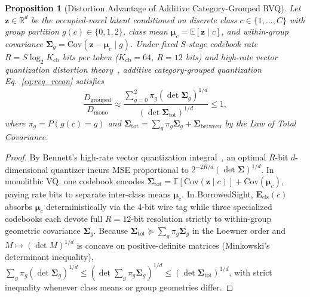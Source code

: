 \documentclass[journal]{IEEEtran}
\newtheorem{proposition}{Proposition}
\begin{document}
\begin{proposition}[Distortion Advantage of Additive Category-Grouped RVQ]
Let $\mathbf{z} \in \mathbb{R}^d$ be the occupied-voxel latent conditioned on discrete class $c \in \{1,\dots,C\}$ with group partition $g(c) \in \{0,1,2\}$, class mean $\boldsymbol{\mu}_c = \mathbb{E}[\mathbf{z}\mid c]$, and within-group covariance $\boldsymbol{\Sigma}_g = \mathrm{Cov}(\mathbf{z} - \boldsymbol{\mu}_c \mid g)$. Under fixed $S$-stage codebook rate $R = S \log_2 K_{\mathrm{cb}}$ bits per token ($K_{\mathrm{cb}} = 64$, $R = 12$ bits) and high-rate vector quantization distortion theory~\cite{gray1998quantization}, additive category-grouped quantization Eq.~\eqref{eq:rvq_recon} satisfies
\begin{equation}
\frac{D_{\mathrm{grouped}}}{D_{\mathrm{mono}}} \approx \frac{\sum_{g=0}^{2} \pi_g \left(\det \boldsymbol{\Sigma}_g\right)^{1/d}}{\left(\det \boldsymbol{\Sigma}_{\mathrm{tot}}\right)^{1/d}} \le 1,
\label{eq:rd_ratio}
\end{equation}
where $\pi_g = P(g(c) = g)$ and $\boldsymbol{\Sigma}_{\mathrm{tot}} = \sum_g \pi_g \boldsymbol{\Sigma}_g + \boldsymbol{\Sigma}_{\mathrm{between}}$ by the Law of Total Covariance.
\end{proposition}
\begin{proof}
By Bennett's high-rate vector quantization integral~\cite{gray1998quantization}, an optimal $R$-bit $d$-dimensional quantizer incurs MSE proportional to $2^{-2R/d} (\det \boldsymbol{\Sigma})^{1/d}$. In monolithic VQ, one codebook encodes $\boldsymbol{\Sigma}_{\mathrm{tot}} = \mathbb{E}[\mathrm{Cov}(\mathbf{z}\mid c)] + \mathrm{Cov}(\boldsymbol{\mu}_c)$, paying rate bits to separate inter-class means $\boldsymbol{\mu}_c$. In BorrowedSight, $\mathbf{E}_{\mathrm{cls}}(c)$ absorbs $\boldsymbol{\mu}_c$ deterministically via the 4-bit wire tag while three specialized codebooks each devote full $R = 12$-bit resolution strictly to within-group geometric covariance $\boldsymbol{\Sigma}_g$. Because $\boldsymbol{\Sigma}_{\mathrm{tot}} \succeq \sum_g \pi_g \boldsymbol{\Sigma}_g$ in the Loewner order and $M \mapsto (\det M)^{1/d}$ is concave on positive-definite matrices (Minkowski's determinant inequality), $\sum_g \pi_g (\det\boldsymbol{\Sigma}_g)^{1/d} \le (\det \sum_g \pi_g \boldsymbol{\Sigma}_g)^{1/d} \le (\det \boldsymbol{\Sigma}_{\mathrm{tot}})^{1/d}$, with strict inequality whenever class means or group geometries differ.
\end{proof}
\end{document}
